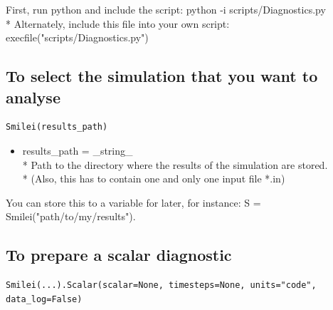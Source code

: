 \documentclass[11pt]{article}
\newcommand{\code}[1]{\colorbox{yellow!15}{\ttfamily #1}}
\begin{document}
First, run python and include the script: \code{python -i scripts/Diagnostics.py}\\*
Alternately, include this file into your own script: \code{execfile("scripts/Diagnostics.py")}
\vspace{0.5cm}

\subsection{To select the simulation that you want to analyse}

\begin{lstlisting}
Smilei(results_path)
\end{lstlisting}

\begin{itemize}
\item \code{results\_path} = \code{\_string\_}\\*
	Path to the directory where the results of the simulation are stored.\\*
	(Also, this has to contain one and only one input file *.in)
\end{itemize}

You can store this to a variable for later, for instance: \code{S = Smilei("path/to/my/results")}.

\subsection{To prepare a scalar diagnostic}

\begin{lstlisting}
Smilei(...).Scalar(scalar=None, timesteps=None, units="code", data_log=False)
\end{lstlisting}
\end{document}
